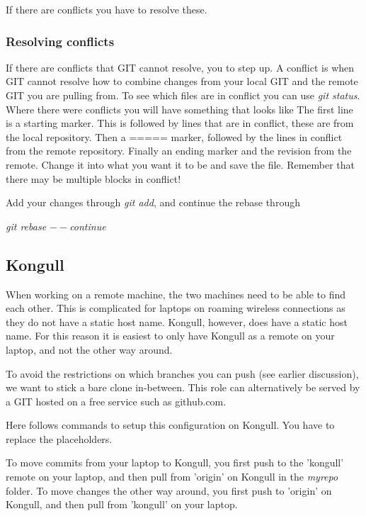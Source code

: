 \documentclass[twoside, 11pt, a4paper]{article}
\begin{document}
If there are conflicts you have to resolve these.

\subsubsection*{Resolving conflicts}
If there are conflicts that GIT cannot resolve, you to step up.
A conflict is when GIT cannot resolve how to combine changes from
your local GIT and the remote GIT you are pulling from.
To see which files are in conflict you can use \emph{git status}.
Where there were conflicts you will have something that
looks like 
The first line is a starting marker. This is followed by lines that are
in conflict, these are from the local repository. Then a ===== marker,
followed by the lines in conflict from the remote repository. Finally
an ending marker and the revision from the remote. Change it into
what you want it to be and save the file. Remember that there may
be multiple blocks in conflict!

Add your changes through \emph{git add}, and continue the rebase
through \\
\begin{center}\emph{git rebase $--$continue}\end{center}
\newpage
\subsection*{Kongull}
When working on a remote machine, the two machines need to be able to
find each other. This is complicated for laptops on roaming wireless
connections as they do not have a static host name. Kongull, however,
does have a static host name. For this reason it is easiest to only have
Kongull as a remote on your laptop, and not the other way around.

To avoid the restrictions on which branches you can push (see earlier
discussion), we want to stick a bare clone in-between. This role
can alternatively be served by a GIT hosted on a free service such
as github.com.

Here follows commands to setup this configuration on Kongull. You
have to replace the placeholders.

To move commits from your laptop to Kongull, you first push
to the 'kongull' remote on your laptop, and then pull from 'origin' on Kongull
in the \emph{myrepo} folder. To move changes the other way around, you
first push to 'origin' on Kongull, and then pull from 'kongull' on your laptop.
\end{document}
